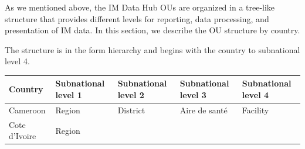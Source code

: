 \documentclass[]{book}
\begin{document}
As we mentioned above, the IM Data Hub OUs are organized in a tree-like structure that provides different levels for reporting, data processing, and presentation of IM data. In this section, we describe the OU structure by country.

The structure is in the form hierarchy and begins with the country to subnational level 4.

\begin{longtable}[]{@{}lllll@{}}
\toprule
\begin{minipage}[b]{0.07\columnwidth}\raggedright
Country\strut
\end{minipage} & \begin{minipage}[b]{0.20\columnwidth}\raggedright
Subnational level 1\strut
\end{minipage} & \begin{minipage}[b]{0.20\columnwidth}\raggedright
Subnational level 2\strut
\end{minipage} & \begin{minipage}[b]{0.20\columnwidth}\raggedright
Subnational level 3\strut
\end{minipage} & \begin{minipage}[b]{0.20\columnwidth}\raggedright
Subnational level 4\strut
\end{minipage}\tabularnewline
\midrule
\endhead
\begin{minipage}[t]{0.07\columnwidth}\raggedright
Cameroon\strut
\end{minipage} & \begin{minipage}[t]{0.20\columnwidth}\raggedright
Region\strut
\end{minipage} & \begin{minipage}[t]{0.20\columnwidth}\raggedright
District\strut
\end{minipage} & \begin{minipage}[t]{0.20\columnwidth}\raggedright
Aire de santé\strut
\end{minipage} & \begin{minipage}[t]{0.20\columnwidth}\raggedright
Facility\strut
\end{minipage}\tabularnewline
\begin{minipage}[t]{0.07\columnwidth}\raggedright
Cote d'Ivoire\strut
\end{minipage} & \begin{minipage}[t]{0.20\columnwidth}\raggedright
Region\strut
\end{minipage} & \begin{minipage}[t]{0.20\columnwidth}\raggedright

\end{minipage}
\end{longtable}
\end{document}
